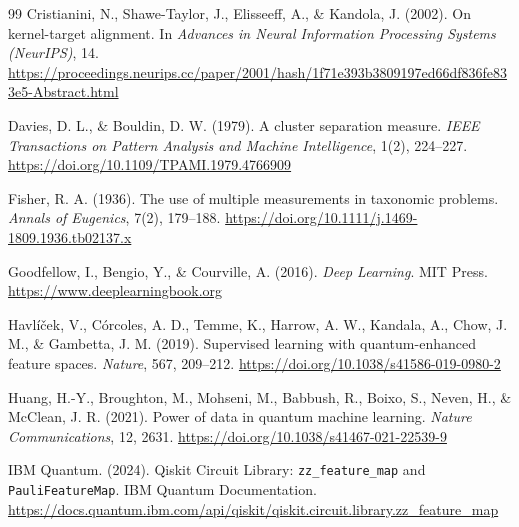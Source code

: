 \begin{thebibliography}{99}
    Cristianini, N., Shawe-Taylor, J., Elisseeff, A., \& Kandola, J. (2002). On kernel-target alignment.
    In \textit{Advances in Neural Information Processing Systems (NeurIPS)}, 14.
    \url{https://proceedings.neurips.cc/paper/2001/hash/1f71e393b3809197ed66df836fe833e5-Abstract.html}


    Davies, D. L., \& Bouldin, D. W. (1979). A cluster separation measure.
    \textit{IEEE Transactions on Pattern Analysis and Machine Intelligence}, 1(2), 224--227.
    \url{https://doi.org/10.1109/TPAMI.1979.4766909}


    Fisher, R. A. (1936). The use of multiple measurements in taxonomic problems.
    \textit{Annals of Eugenics}, 7(2), 179--188.
    \url{https://doi.org/10.1111/j.1469-1809.1936.tb02137.x}


    Goodfellow, I., Bengio, Y., \& Courville, A. (2016). \textit{Deep Learning}. MIT Press.
    \url{https://www.deeplearningbook.org}


    Havl{\'{i}}{\v{c}}ek, V., C{\'{o}}rcoles, A. D., Temme, K., Harrow, A. W., Kandala, A., Chow, J. M., \& Gambetta, J. M. (2019). Supervised learning with quantum-enhanced feature spaces.
    \textit{Nature}, 567, 209--212.
    \url{https://doi.org/10.1038/s41586-019-0980-2}


    Huang, H.-Y., Broughton, M., Mohseni, M., Babbush, R., Boixo, S., Neven, H., \& McClean, J. R. (2021). Power of data in quantum machine learning.
    \textit{Nature Communications}, 12, 2631.
    \url{https://doi.org/10.1038/s41467-021-22539-9}


    IBM Quantum. (2024). Qiskit Circuit Library: \texttt{zz\_feature\_map} and \texttt{PauliFeatureMap}. IBM Quantum Documentation. \url{https://docs.quantum.ibm.com/api/qiskit/qiskit.circuit.library.zz_feature_map}


\end{thebibliography}
